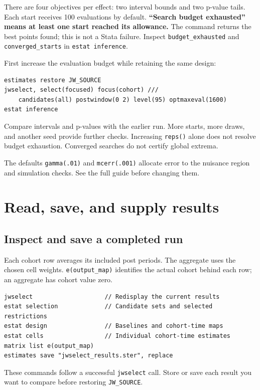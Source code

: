 \documentclass[11pt]{article}
\newcommand{\cmd}[1]{\texttt{#1}}
\begin{document}
There are four objectives per effect: two interval bounds and two p-value
tails. Each start receives 100 evaluations by default.
\textbf{``Search budget exhausted'' means at least one start reached its allowance.}
The command returns the best points found; this is not a Stata failure.
Inspect \cmd{budget\_exhausted} and \cmd{converged\_starts} in \cmd{estat inference}.

First increase the evaluation budget while retaining the same design:
\begin{lstlisting}
estimates restore JW_SOURCE
jwselect, select(focused) focus(cohort) ///
    candidates(all) postwindow(0 2) level(95) optmaxeval(1600)
estat inference
\end{lstlisting}
Compare intervals and p-values with the earlier run. More starts, more draws,
and another seed provide further checks. Increasing \cmd{reps()} alone does
not resolve budget exhaustion. Converged searches do not certify global extrema.

The defaults \cmd{gamma(.01)} and \cmd{mcerr(.001)} allocate error to the
nuisance region and simulation checks. See the full guide before changing them.

\newpage
\section{Read, save, and supply results}
\subsection*{Inspect and save a completed run}
Each cohort row averages its included post periods. The aggregate uses the
chosen cell weights. \cmd{e(output\_map)} identifies the actual cohort behind
each row; an aggregate has cohort value zero.
\begin{lstlisting}
jwselect                    // Redisplay the current results
estat selection             // Candidate sets and selected restrictions
estat design                // Baselines and cohort-time maps
estat cells                 // Individual cohort-time estimates
matrix list e(output_map)
estimates save "jwselect_results.ster", replace
\end{lstlisting}
These commands follow a successful \cmd{jwselect} call. Store or save each
result you want to compare before restoring \cmd{JW\_SOURCE}.
\end{document}
